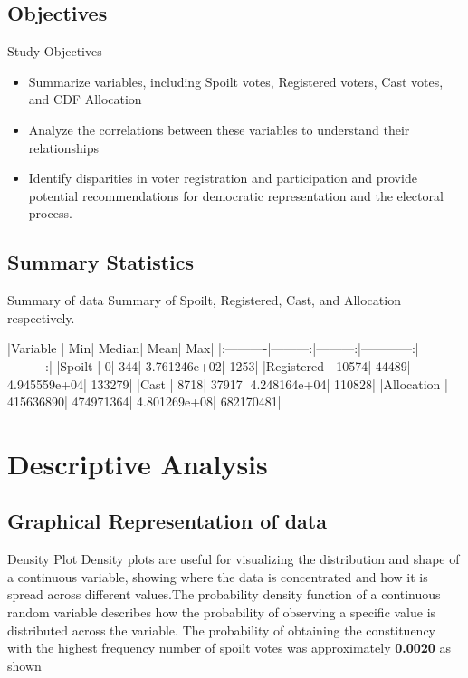 \documentclass{beamer}
\begin{document}
\subsection{Objectives}

\begin{frame}{Study Objectives}
\begin{itemize}
\item Summarize variables, including Spoilt votes, Registered voters, Cast votes, and CDF Allocation
\item Analyze the correlations between these variables to understand their relationships
\item Identify disparities in voter registration and participation and provide potential recommendations for democratic representation and the electoral process.
\end{itemize}

\end{frame}


\subsection{Summary Statistics}


\begin{frame}[fragile]{Summary of data}
Summary of Spoilt, Registered, Cast, and Allocation respectively.
 \\
\begin{Schunk}
\begin{Soutput}
|Variable   |       Min|    Median|         Mean|       Max|
|:----------|---------:|---------:|------------:|---------:|
|Spoilt     |         0|       344| 3.761246e+02|      1253|
|Registered |     10574|     44489| 4.945559e+04|    133279|
|Cast       |      8718|     37917| 4.248164e+04|    110828|
|Allocation | 415636890| 474971364| 4.801269e+08| 682170481|
\end{Soutput}
\end{Schunk}
\end{frame}

\section{Descriptive Analysis}
\subsection{Graphical Representation of data}

\begin{frame}{Density Plot}
Density plots are useful for visualizing the distribution and shape of a continuous variable, showing where the data is concentrated and how it is spread across different values.The probability density function of a continuous random variable describes how the probability of observing a specific value is distributed across the variable. The probability of obtaining the constituency with the highest frequency number of spoilt votes was approximately \textbf {0.0020} as shown
\end{frame}
\end{document}
